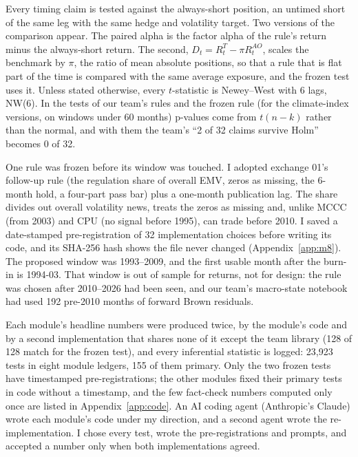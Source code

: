 Every timing claim is tested against the always-short position, an untimed short of the same leg with the same hedge and volatility target. Two versions of the comparison appear. The paired alpha is the factor alpha of the rule's return minus the always-short return. The second, $D_t=R^T_t-\pi R^{AO}_t$, scales the benchmark by $\pi$, the ratio of mean absolute positions, so that a rule that is flat part of the time is compared with the same average exposure, and the frozen test uses it. Unless stated otherwise, every $t$-statistic is Newey--West \citep{nw1987} with 6 lags, NW(6). In the tests of our team's rules and the frozen rule (for the climate-index versions, on windows under 60 months) p-values come from $t(n-k)$ rather than the normal, and with them the team's ``2 of 32 claims survive Holm'' \citep{holm1979} becomes 0 of 32.

One rule was frozen before its window was touched. I adopted exchange 01's follow-up rule (the regulation share of overall EMV, zeros as missing, the 6-month hold, a four-part pass bar) plus a one-month publication lag. The share divides out overall volatility news, treats the zeros as missing and, unlike MCCC (from 2003) and CPU (no signal before 1995), can trade before 2010. I saved a date-stamped pre-registration of 32 implementation choices before writing its code, and its SHA-256 hash shows the file never changed (Appendix~\ref{app:m8}). The proposed window was 1993--2009, and the first usable month after the burn-in is 1994-03. That window is out of sample for returns, not for design: the rule was chosen after 2010--2026 had been seen, and our team's macro-state notebook had used 192 pre-2010 months of forward Brown residuals.

Each module's headline numbers were produced twice, by the module's code and by a second implementation that shares none of it except the team library (128 of 128 match for the frozen test), and every inferential statistic is logged: 23,923 tests in eight module ledgers, 155 of them primary. Only the two frozen tests have timestamped pre-registrations; the other modules fixed their primary tests in code without a timestamp, and the few fact-check numbers computed only once are listed in Appendix~\ref{app:code}. An AI coding agent (Anthropic's Claude) wrote each module's code under my direction, and a second agent wrote the re-implementation. I chose every test, wrote the pre-registrations and prompts, and accepted a number only when both implementations agreed.

